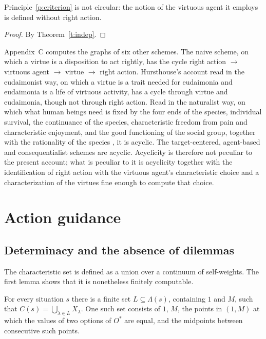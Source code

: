 \documentclass{situationist-preprint}
\newcommand{\Ch}{C}
\begin{document}
\begin{corollary}\label{c:noncirc}
Principle~\ref{p:criterion} is not circular: the notion of the virtuous agent it employs is defined without right action.
\end{corollary}

\begin{proof}
By Theorem~\ref{t:indep}.
\end{proof}

\begin{remark}\label{r:readings}
Appendix~C computes the graphs of six other schemes. The naive scheme, on which a virtue is a disposition to act rightly, has the cycle right action $\to$ virtuous agent $\to$ virtue $\to$ right action. Hursthouse's account read in the eudaimonist way, on which a virtue is a trait needed for eudaimonia and eudaimonia is a life of virtuous activity, has a cycle through virtue and eudaimonia, though not through right action. Read in the naturalist way, on which what human beings need is fixed by the four ends of the species, individual survival, the continuance of the species, characteristic freedom from pain and characteristic enjoyment, and the good functioning of the social group, together with the rationality of the species \citep[ch.~9]{Hursthouse1999}, it is acyclic. The target-centered, agent-based and consequentialist schemes are acyclic. Acyclicity is therefore not peculiar to the present account; what is peculiar to it is acyclicity together with the identification of right action with the virtuous agent's characteristic choice and a characterization of the virtues fine enough to compute that choice.
\end{remark}

\section{Action guidance}\label{s:guidance}

\subsection{Determinacy and the absence of dilemmas}

The characteristic set is defined as a union over a continuum of self-weights. The first lemma shows that it is nonetheless finitely computable.

\begin{lemma}\label{l:finite}
For every situation $s$ there is a finite set $L\subseteq\Lambda(s)$, containing $1$ and $M$, such that $\Ch(s)=\bigcup_{\lambda\in L}X_\lambda$. One such set consists of $1$, $M$, the points in $(1,M)$ at which the values of two options of $O^\ast$ are equal, and the midpoints between consecutive such points.
\end{lemma}
\end{document}
